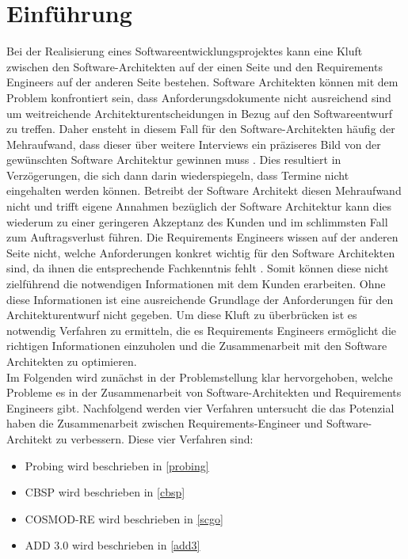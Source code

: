 \section{Einf\"uhrung}
Bei der Realisierung eines Softwareentwicklungsprojektes kann eine Kluft zwischen den Software-Architekten auf der einen Seite und den Requirements Engineers auf der anderen Seite bestehen. Software Architekten k\"onnen mit dem Problem konfrontiert sein, dass Anforderungsdokumente nicht ausreichend sind um weitreichende Architekturentscheidungen in Bezug auf den Softwareentwurf zu treffen. Daher ensteht in diesem Fall f\"ur den Software-Architekten h\"aufig der Mehraufwand, dass dieser \"uber weitere Interviews ein pr\"aziseres Bild von der gew\"unschten Software Architektur gewinnen muss \cite{Ros01}. Dies resultiert in Verz\"ogerungen, die sich dann darin wiederspiegeln, dass Termine nicht eingehalten werden k\"onnen. Betreibt der Software Architekt diesen Mehraufwand nicht und trifft eigene Annahmen bez\"uglich der Software Architektur \cite{Ros01} kann dies wiederum zu einer geringeren Akzeptanz des Kunden und im schlimmsten Fall zum Auftragsverlust f\"uhren. Die Requirements Engineers wissen auf der anderen Seite nicht, welche Anforderungen konkret wichtig f\"ur den Software Architekten sind, da ihnen die entsprechende Fachkenntnis fehlt \cite{Ros01}. Somit k\"onnen diese nicht zielf\"uhrend die notwendigen Informationen mit dem Kunden erarbeiten. Ohne diese Informationen ist eine ausreichende Grundlage der Anforderungen f\"ur den Architekturentwurf nicht gegeben. Um diese Kluft zu \"uberbr\"ucken ist es notwendig Verfahren zu ermitteln, die es Requirements Engineers erm\"oglicht die richtigen Informationen einzuholen und die Zusammenarbeit mit den Software Architekten zu optimieren.\\

Im Folgenden wird zun\"achst in der Problemstellung klar hervorgehoben, welche Probleme es in der Zusammenarbeit von Software-Architekten und Requirements Engineers gibt. Nachfolgend werden vier Verfahren untersucht die das Potenzial haben die Zusammenarbeit zwischen Requirements-Engineer und Software-Architekt zu verbessern. Diese vier Verfahren sind:\\

\begin{itemize}
\item Probing wird beschrieben in \ref{probing}
\item CBSP wird beschrieben in \ref{cbsp}
\item COSMOD-RE wird beschrieben in \ref{scgo}
\item ADD 3.0 wird beschrieben in \ref{add3}\\
\end{itemize}

